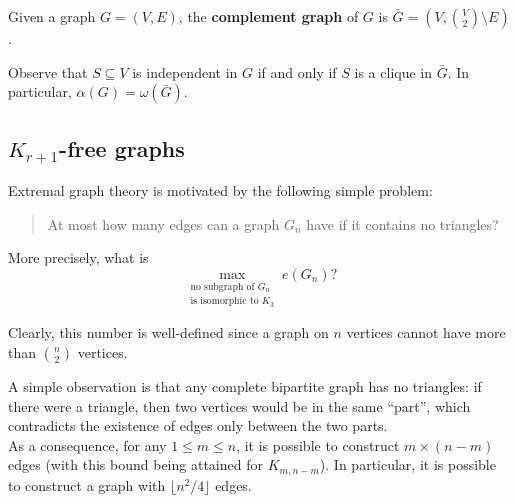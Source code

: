 \documentclass{article}
\begin{document}
		\begin{fdef}
			Given a graph $G=(V,E)$, the \textbf{complement graph} of $G$ is $\bar{G} = (V,\binom{V}{2} \setminus E)$.
		\end{fdef}

		Observe that $S \subseteq V$ is independent in $G$ if and only if $S$ is a clique in $\bar{G}$. In particular, $\alpha(G) = \omega(\bar{G})$.

	\subsection{\texorpdfstring{$K_{r+1}$}{K r+1}-free graphs}

		Extremal graph theory is motivated by the following simple problem:

		\begin{quote}
			At most how many edges can a graph $G_n$ have if it contains no triangles?
		\end{quote}

		More precisely, what is
		\[ \max_{\substack{\text{no subgraph of $G_n$} \\ \text{is isomorphic to $K_3$}}} e(G_n)? \]

		Clearly, this number is well-defined since a graph on $n$ vertices cannot have more than $\binom{n}{2}$ vertices.

		A simple observation is that any complete bipartite graph has no triangles: if there were a triangle, then two vertices would be in the same ``part'', which contradicts the existence of edges only between the two parts.\\
		As a consequence, for any $1 \le m \le n$, it is possible to construct $m \times (n-m)$ edges (with this bound being attained for $K_{m,n-m}$). In particular, it is possible to construct a graph with $\lfloor n^2 / 4 \rfloor$ edges.
\end{document}
